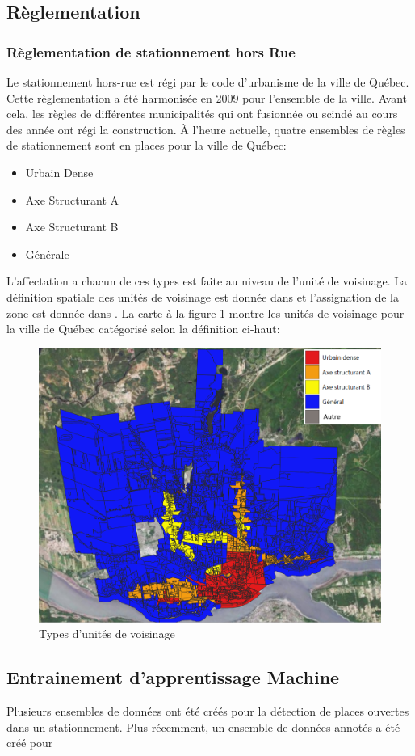   \subsection{Règlementation}
    \subsubsection{Règlementation de stationnement hors Rue}
      Le stationnement hors-rue est régi par le code d'urbanisme de la ville de Québec. Cette règlementation a été harmonisée en 2009 pour l'ensemble de la ville. Avant cela, les règles de différentes municipalités qui ont fusionnée ou scindé au cours des année ont régi la construction. À l'heure actuelle, quatre ensembles de règles de stationnement sont en places pour la ville de Québec:
      \begin{itemize}
        \item Urbain Dense 
        \item Axe Structurant A
        \item Axe Structurant B
        \item Générale
      \end{itemize}
      L'affectation a chacun de ces types est faite au niveau de l'unité de voisinage. La définition spatiale des unités de voisinage est donnée dans \textcite{VilledeQuebec:ZonageMunicipal:2024} et l'assignation de la zone est donnée dans \textcite{VilledeQuebec:GrilleSpecifications:2024}. La carte à la figure \ref{fig:types_unites_voisinage} montre les unités de voisinage pour la ville de Québec catégorisé selon la définition ci-haut:
      \begin{figure}
        \centering
        \includegraphics[width=0.5\linewidth]{images/Types_unites_voisinage.png}
        \caption{Types d'unités de voisinage}
        \label{fig:types_unites_voisinage}
      \end{figure}
      \FloatBarrier
  \subsection{Entrainement d'apprentissage Machine}
    Plusieurs ensembles de données ont été créés pour la détection de places ouvertes dans un stationnement. Plus récemment, un ensemble de données annotés a été créé pour 

